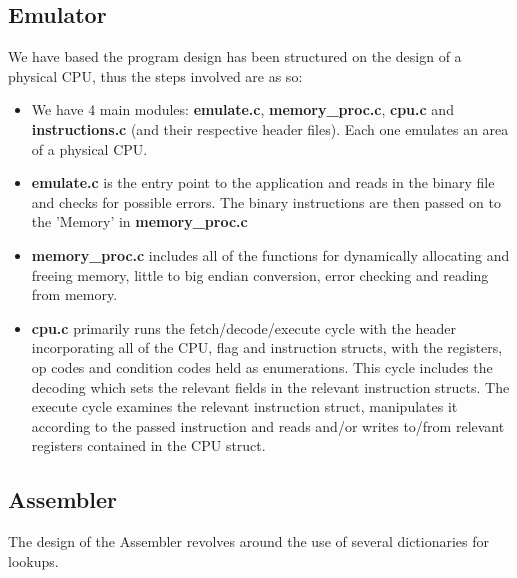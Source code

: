 \documentclass[11pt]{article}
\begin{document}
\subsection{Emulator}
We have based the program design has been structured on the design of a physical CPU, thus the steps involved are as so:
\begin{itemize}

\item
We have 4 main modules: \textbf{emulate.c}, \textbf{memory\_proc.c}, \textbf{cpu.c} and \textbf{instructions.c} (and their respective header files). Each one emulates an area of a physical CPU.

\item
\textbf{emulate.c} is the entry point to the application and reads in the binary file and checks for possible errors. The binary instructions are then passed on to the 'Memory' in \textbf{memory\_proc.c}

\item
\textbf{memory\_proc.c} includes all of the functions for dynamically allocating and freeing memory, little to big endian conversion, error checking and reading from memory.

\item
\textbf{cpu.c} primarily runs the fetch/decode/execute cycle with the header incorporating all of the CPU, flag and instruction structs, with the registers, op codes and condition codes held as enumerations. This cycle includes the decoding which sets the relevant fields in the relevant instruction structs. The execute cycle examines the relevant instruction struct, manipulates it according to the passed instruction and reads and/or writes to/from relevant registers contained in the CPU struct. 

\end{itemize}

\subsection{Assembler}
The design of the Assembler revolves around the use of several dictionaries for lookups.
\end{document}
